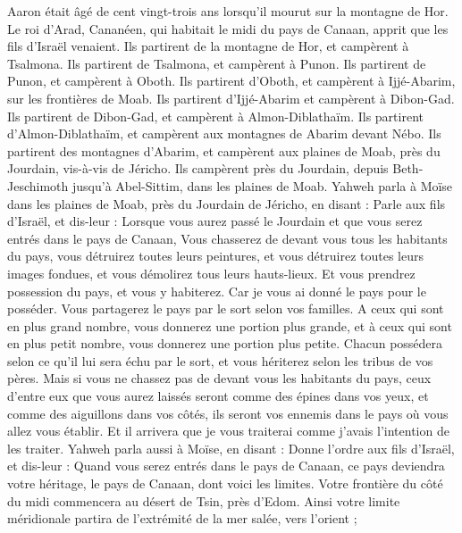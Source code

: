 \begin{multicols}{2}
Aaron était âgé de cent vingt-trois ans lorsqu’il mourut sur la montagne de Hor.
Le roi d’Arad, Cananéen, qui habitait le midi du pays de Canaan, apprit que les fils d'Israël venaient.
Ils partirent de la montagne de Hor, et campèrent à Tsalmona.
Ils partirent de Tsalmona, et campèrent à Punon.
Ils partirent de Punon, et campèrent à Oboth.
Ils partirent d'Oboth, et campèrent à Ijjé-Abarim, sur les frontières de Moab.
Ils partirent d’Ijjé-Abarim et campèrent à Dibon-Gad.
Ils partirent de Dibon-Gad, et campèrent à Almon-Diblathaïm.
Ils partirent d’Almon-Diblathaïm, et campèrent aux montagnes de Abarim devant Nébo.
Ils partirent des montagnes d’Abarim, et campèrent aux plaines de Moab, près du Jourdain, vis-à-vis de Jéricho.
Ils campèrent près du Jourdain, depuis Beth-Jeschimoth jusqu'à Abel-Sittim, dans les plaines de Moab.
Yahweh parla à Moïse dans les plaines de Moab, près du Jourdain de Jéricho, en disant :
Parle aux fils d’Israël, et dis-leur : Lorsque vous aurez passé le Jourdain et que vous serez entrés dans le pays de Canaan,
Vous chasserez de devant vous tous les habitants du pays, vous détruirez toutes leurs peintures, et vous détruirez toutes leurs images fondues, et vous démolirez tous leurs hauts-lieux.
Et vous prendrez possession du pays, et vous y habiterez. Car je vous ai donné le pays pour le posséder.
Vous partagerez le pays par le sort selon vos familles. A ceux qui sont en plus grand nombre, vous donnerez une portion plus grande, et à ceux qui sont en plus petit nombre, vous donnerez une portion plus petite. Chacun possédera selon ce qu'il lui sera échu par le sort, et vous hériterez selon les tribus de vos pères.
Mais si vous ne chassez pas de devant vous les habitants du pays, ceux d'entre eux que vous aurez laissés seront comme des épines dans vos yeux, et comme des aiguillons dans vos côtés, ils seront vos ennemis dans le pays où vous allez vous établir.
Et il arrivera que je vous traiterai comme j'avais l’intention de les traiter.
\VerseOne{}Yahweh parla aussi à Moïse, en disant :
Donne l’ordre aux fils d'Israël, et dis-leur : Quand vous serez entrés dans le pays de Canaan, ce pays deviendra votre héritage, le pays de Canaan, dont voici les limites.
Votre frontière du côté du midi commencera au désert de Tsin, près d'Edom. Ainsi votre limite méridionale partira de l’extrémité de la mer salée, vers l'orient ;

\end{multicols}
